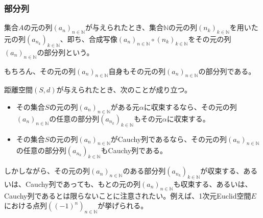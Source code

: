 \documentclass[dvipdfmx]{jsarticle}
\begin{document}
\subsubsection{部分列}%
\begin{dfn*}
集合$A$の元の列$\left( a_{n} \right)_{n \in \mathbb{N}}$が与えられたとき、集合$\mathbb{N}$の元の列$\left( n_{k} \right)_{k \in \mathbb{N}}$を用いた元の列$\left( a_{n_{k}} \right)_{k \in \mathbb{N}}$、即ち、合成写像$\left( a_{n} \right)_{n \in \mathbb{N}} \circ \left( n_{k} \right)_{k \in \mathbb{N}}$をその元の列$\left( a_{n} \right)_{n \in \mathbb{N}}$の部分列という。
\end{dfn*}\par
もちろん、その元の列$\left( a_{n} \right)_{n \in \mathbb{N}}$自身もその元の列$\left( a_{n} \right)_{n \in \mathbb{N}}$の部分列である。
\begin{thm}\label{8.2.4.18} 距離空間$(S,d)$が与えられたとき、次のことが成り立つ。
\begin{itemize}
\item
  その集合$S$の元の列$\left( a_{n} \right)_{n \in \mathbb{N}}$がある元$\alpha$に収束するなら、その元の列$\left( a_{n} \right)_{n \in \mathbb{N}}$の任意の部分列$\left( a_{n_{k}} \right)_{k \in \mathbb{N}}$もその元$\alpha$に収束する。
\item
  その集合$S$の元の列$\left( a_{n} \right)_{n \in \mathbb{N}}$がCauchy列であるなら、その元の列$\left( a_{n} \right)_{n \in \mathbb{N}}$の任意の部分列$\left( a_{n_{k}} \right)_{k \in \mathbb{N}}$もCauchy列である。
\end{itemize}
\end{thm}\par
しかしながら、その元の列$\left( a_{n} \right)_{n \in \mathbb{N}}$のある部分列$\left( a_{n_{k}} \right)_{k \in \mathbb{N}}$が収束する、あるいは、Cauchy列であっても、もとの元の列$\left( a_{n} \right)_{n \in \mathbb{N}}$も収束する、あるいは、Cauchy列であるとは限らないことに注意されたい。例えば、1次元Euclid空間$E$における点列$\left((-1)^n \right)_{n\in \mathbb{N}}$が挙げられる。
\end{document}
